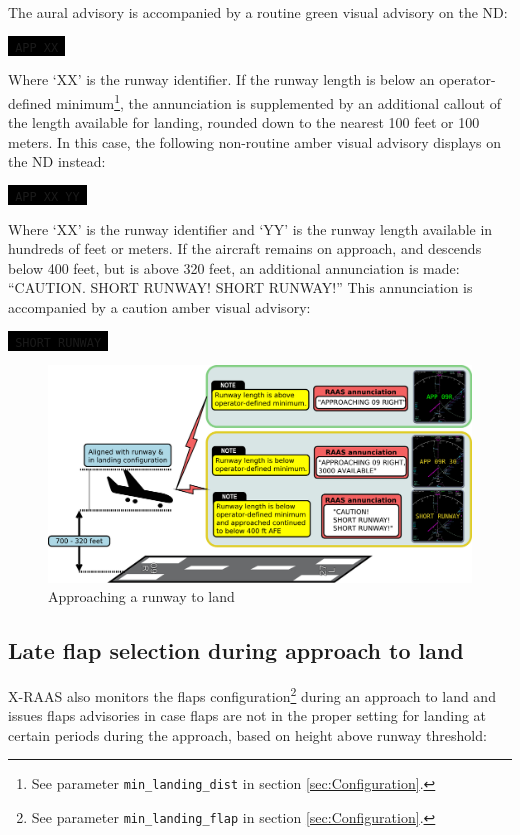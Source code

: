 \documentclass[a4paper,12pt]{article}
\newcommand{\visualadvisory}[3][b]{%
    \ifthenelse{\equal{#1}{b}}{\begin{center}}{}
    \noindent
    \colorbox{black}{\textcolor{#2visualadvisorycolor}{\large\texttt{~#3~}}}
    \ifthenelse{\equal{#1}{b}}{\end{center}}{}}
\newcommand{\confopt}[1]{\texttt{#1}}
\begin{document}
\noindent The aural advisory is accompanied by a routine green visual
advisory on the ND:

\visualadvisory{routine}{APP XX}

\noindent Where `XX' is the runway identifier. If the runway length is
below an operator-defined minimum\footnote{See parameter
\confopt{min\_landing\_dist} in section \ref{sec:Configuration}.}, the
annunciation is supplemented by an additional callout of the length
available for landing, rounded down to the nearest 100 feet or 100
meters. In this case, the following non-routine amber visual advisory
displays on the ND instead:

\visualadvisory{nonroutine}{APP XX YY}

\noindent Where `XX' is the runway identifier and `YY' is the runway
length available in hundreds of feet or meters. If the aircraft remains
on approach, and descends below 400 feet, but is above 320 feet, an
additional annunciation is made: ``CAUTION. SHORT RUNWAY! SHORT RUNWAY!''
This annunciation is accompanied by a caution amber visual advisory:

\visualadvisory{nonroutine}{SHORT RUNWAY}

\begin{figure}[H]
\begin{center}
\includegraphics[width=\textwidth]{../src/apch_land.pdf}
\end{center}
\caption{Approaching a runway to land}
\end{figure}

\subsection{Late flap selection during approach to land}
\label{subsec:ApchFlapsMon}

X-RAAS also monitors the flaps configuration\footnote{See parameter
\confopt{min\_landing\_flap} in section \ref{sec:Configuration}.} during an
approach to land and issues flaps advisories in case flaps are not in the
proper setting for landing at certain periods during the approach, based
on height above runway threshold:
\end{document}
